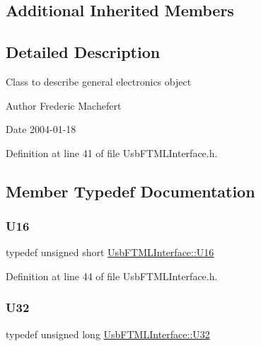\subsection*{Additional Inherited Members}


\subsection{Detailed Description}
Class to describe general electronics object

\begin{DoxyAuthor}{Author}
Frederic Machefert 
\end{DoxyAuthor}
\begin{DoxyDate}{Date}
2004-\/01-\/18 
\end{DoxyDate}


Definition at line 41 of file Usb\+F\+T\+M\+L\+Interface.\+h.



\subsection{Member Typedef Documentation}
\mbox{\label{classUsbFTMLInterface_a5909beb462dc45c772d6f7ae79312ad7}} 
\subsubsection{\texorpdfstring{U16}{U16}}
{\footnotesize\ttfamily typedef unsigned short \hyperlink{classUsbFTMLInterface_a5909beb462dc45c772d6f7ae79312ad7}{Usb\+F\+T\+M\+L\+Interface\+::\+U16}}



Definition at line 44 of file Usb\+F\+T\+M\+L\+Interface.\+h.

\mbox{\label{classUsbFTMLInterface_a142f8ce4b5873c295af8945f3894ae38}} 
\subsubsection{\texorpdfstring{U32}{U32}}
{\footnotesize\ttfamily typedef unsigned long \hyperlink{classUsbFTMLInterface_a142f8ce4b5873c295af8945f3894ae38}{Usb\+F\+T\+M\+L\+Interface\+::\+U32}}



